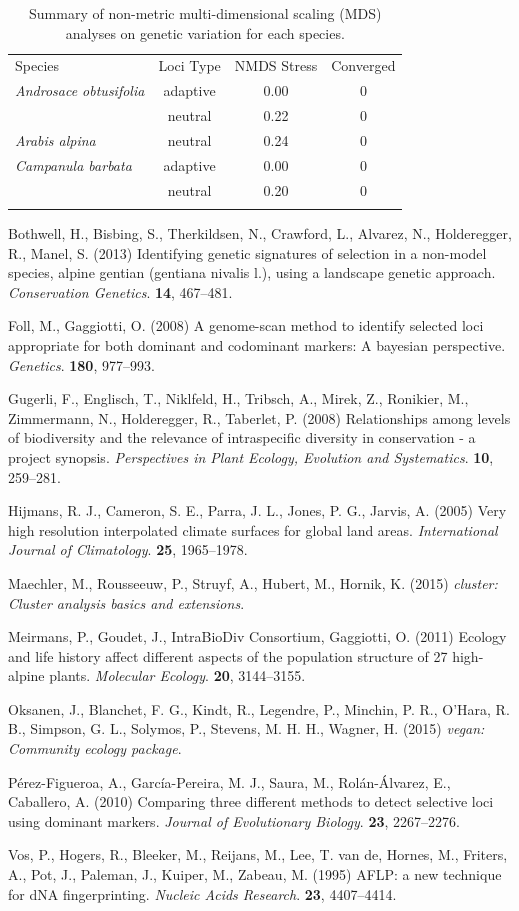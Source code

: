 \documentclass[11pt,]{article}
\begin{document}
\begin{longtable}[c]{@{}lccc@{}}
\toprule\addlinespace
Species & Loci Type & NMDS Stress & Converged
\\\addlinespace
\midrule\endhead
\textit{Androsace obtusifolia} & adaptive & 0.00 & 0
\\\addlinespace
& neutral & 0.22 & 0
\\\addlinespace
\textit{Arabis alpina} & neutral & 0.24 & 0
\\\addlinespace
\textit{Campanula barbata} & adaptive & 0.00 & 0
\\\addlinespace
& neutral & 0.20 & 0
\\\addlinespace
\bottomrule
\addlinespace
\caption{Summary of non-metric multi-dimensional scaling (MDS) analyses
on genetic variation for each species.}
\end{longtable}

Bothwell, H., Bisbing, S., Therkildsen, N., Crawford, L., Alvarez, N.,
Holderegger, R., Manel, S. (2013) Identifying genetic signatures of
selection in a non-model species, alpine gentian (gentiana nivalis l.),
using a landscape genetic approach. \emph{Conservation Genetics}.
\textbf{14}, 467--481.

Foll, M., Gaggiotti, O. (2008) A genome-scan method to identify selected
loci appropriate for both dominant and codominant markers: A bayesian
perspective. \emph{Genetics}. \textbf{180}, 977--993.

Gugerli, F., Englisch, T., Niklfeld, H., Tribsch, A., Mirek, Z.,
Ronikier, M., Zimmermann, N., Holderegger, R., Taberlet, P. (2008)
Relationships among levels of biodiversity and the relevance of
intraspecific diversity in conservation - a project synopsis.
\emph{Perspectives in Plant Ecology, Evolution and Systematics}.
\textbf{10}, 259--281.

Hijmans, R. J., Cameron, S. E., Parra, J. L., Jones, P. G., Jarvis, A.
(2005) Very high resolution interpolated climate surfaces for global
land areas. \emph{International Journal of Climatology}. \textbf{25},
1965--1978.

Maechler, M., Rousseeuw, P., Struyf, A., Hubert, M., Hornik, K. (2015)
\emph{cluster: Cluster analysis basics and extensions}.

Meirmans, P., Goudet, J., IntraBioDiv Consortium, Gaggiotti, O. (2011)
Ecology and life history affect different aspects of the population
structure of 27 high-alpine plants. \emph{Molecular Ecology}.
\textbf{20}, 3144--3155.

Oksanen, J., Blanchet, F. G., Kindt, R., Legendre, P., Minchin, P. R.,
O'Hara, R. B., Simpson, G. L., Solymos, P., Stevens, M. H. H., Wagner,
H. (2015) \emph{vegan: Community ecology package}.

P{é}rez-Figueroa, A., Garc{í}a-Pereira, M. J., Saura, M.,
Rol{á}n-{Á}lvarez, E., Caballero, A. (2010) Comparing three different
methods to detect selective loci using dominant markers. \emph{Journal
of Evolutionary Biology}. \textbf{23}, 2267--2276.

Vos, P., Hogers, R., Bleeker, M., Reijans, M., Lee, T. van de, Hornes,
M., Friters, A., Pot, J., Paleman, J., Kuiper, M., Zabeau, M. (1995)
AFLP: a new technique for dNA fingerprinting. \emph{Nucleic Acids
Research}. \textbf{23}, 4407--4414.
\end{document}
